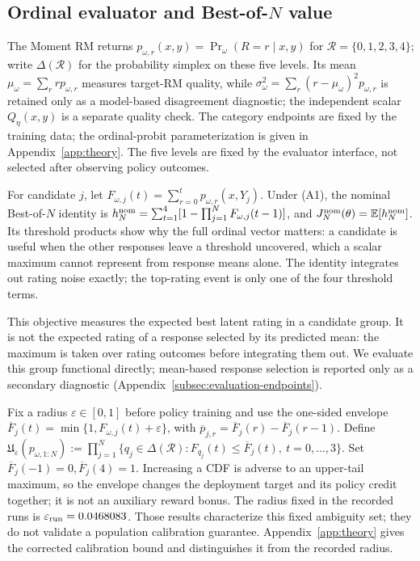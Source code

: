 \documentclass{article}
\theoremstyle{definition}
\theoremstyle{remark}
\begin{document}
\subsection{Ordinal evaluator and Best-of-\(N\) value}
The Moment RM returns \(p_{\omega,r}(x,y)=\Pr_\omega(R=r\mid x,y)\) for
\(\mathcal R=\{0,1,2,3,4\}\); write \(\Delta(\mathcal R)\) for the probability
simplex on these five levels.  Its mean
\(\mu_\omega=\sum_r rp_{\omega,r}\) measures target-RM quality, while
\(\sigma_\omega^2=\sum_r(r-\mu_\omega)^2p_{\omega,r}\) is retained only as a
model-based disagreement diagnostic; the independent scalar \(Q_\eta(x,y)\) is a
separate quality check.  The category endpoints are fixed by the training data;
the ordinal-probit parameterization is given in Appendix~\ref{app:theory}.
The five levels are fixed by the evaluator interface, not selected after
observing policy outcomes.

For candidate \(j\), let \(F_{\omega,j}(t)=\sum_{r=0}^{t}p_{\omega,r}(x,Y_j)\).
Under (A1), the nominal Best-of-\(N\) identity is
\(h_N^{\rm nom}=\sum_{t=1}^{4}[1-\prod_{j=1}^{N}F_{\omega,j}(t-1)]\), and
\(J_N^{\rm nom}(\theta)=\mathbb E[h_N^{\rm nom}]\).  Its threshold products
show why the full ordinal vector matters: a candidate is useful when the other
responses leave a threshold uncovered, which a scalar maximum cannot represent
from response means alone. The identity integrates out rating noise exactly;
the top-rating event is only one of the four threshold terms.

This objective measures the expected best latent rating in a candidate group.
It is not the expected rating of a response selected by its predicted mean:
the maximum is taken over rating outcomes before integrating them out.
We evaluate this group functional directly; mean-based response selection is
reported only as a secondary diagnostic
(Appendix~\ref{subsec:evaluation-endpoints}).

Fix a radius \(\varepsilon\in[0,1]\) before policy training and use the
one-sided envelope
\(\overline F_j(t)=\min\{1,F_{\omega,j}(t)+\varepsilon\}\), with
\(\overline p_{j,r}=\overline F_j(r)-\overline F_j(r-1)\).  Define
\(\mathfrak U_{\varepsilon}(p_{\omega,1:N})
:=\prod_{j=1}^{N}\{q_j\in\Delta(\mathcal R):
F_{q_j}(t)\le\overline F_j(t),\ t=0,\ldots,3\}\).  Set
\(\overline F_j(-1)=0,\overline F_j(4)=1\).  Increasing a CDF is adverse to an
upper-tail maximum, so the envelope changes the deployment target and its
policy credit together; it is not an auxiliary reward bonus. The radius
fixed in the recorded runs is \(\varepsilon_{\rm run}=0.0468083\).
Those results characterize this fixed ambiguity set; they do not validate a
population calibration guarantee. Appendix~\ref{app:theory} gives the corrected
calibration bound and distinguishes it from the recorded radius.
\end{document}
